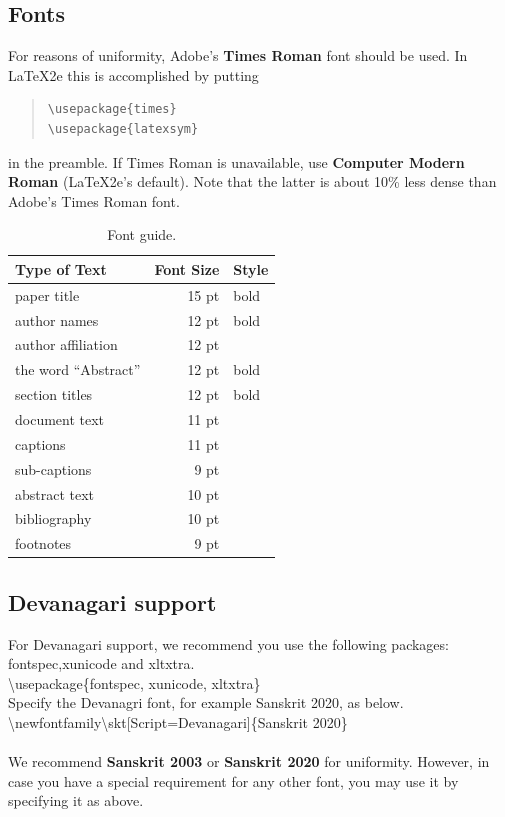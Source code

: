 \documentclass[11pt]{article}
\begin{document}
\subsection{Fonts}
For reasons of uniformity, Adobe's {\bf Times Roman} font should be
used. In \LaTeX2e{} this is accomplished by putting

\begin{quote}
\begin{verbatim}
\usepackage{times}
\usepackage{latexsym}
\end{verbatim}
\end{quote}
in the preamble. If Times Roman is unavailable, use {\bf Computer
  Modern Roman} (\LaTeX2e{}'s default).  Note that the latter is about
  10\% less dense than Adobe's Times Roman font.

\begin{table}[h]
\begin{center}
\begin{tabular}{|l|rl|}
\hline \bf Type of Text & \bf Font Size & \bf Style \\ \hline
paper title & 15 pt & bold \\
author names & 12 pt & bold \\
author affiliation & 12 pt & \\
the word ``Abstract'' & 12 pt & bold \\
section titles & 12 pt & bold \\
document text & 11 pt  &\\
captions & 11 pt & \\
sub-captions & 9 pt & \\
abstract text & 10 pt & \\
bibliography & 10 pt & \\
footnotes & 9 pt & \\
\hline
\end{tabular}
\end{center}
\caption{\label{font-table} Font guide. }
\end{table}

\subsection{Devanagari support}
For Devanagari support, we recommend you use the following packages: fontspec,xunicode and xltxtra. \\
\textbackslash usepackage\{fontspec, xunicode, xltxtra\}\\
Specify the Devanagri font, for example Sanskrit 2020, as below.\\
\textbackslash newfontfamily\textbackslash skt[Script=Devanagari]\{Sanskrit 2020\}\\ \\
We recommend {\bf Sanskrit 2003} or {\bf Sanskrit 2020} for uniformity. However, in case you have a special requirement for any other font, you may use it by specifying it as above.\\
\end{document}
